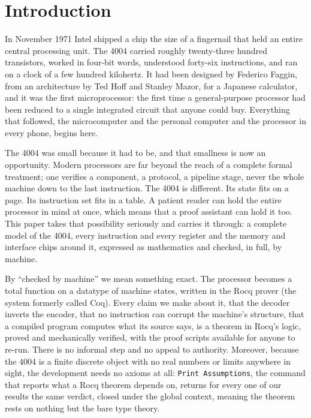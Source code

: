 \documentclass[11pt]{amsart}
\theoremstyle{plain}
\theoremstyle{definition}
\newcommand{\code}[1]{\texttt{#1}}
\begin{document}
\section{Introduction}

In November 1971 Intel shipped a chip the size of a fingernail that held an entire central processing unit. The 4004 carried roughly twenty-three hundred transistors, worked in four-bit words, understood forty-six instructions, and ran on a clock of a few hundred kilohertz. It had been designed by Federico Faggin, from an architecture by Ted Hoff and Stanley Mazor, for a Japanese calculator, and it was the first microprocessor: the first time a general-purpose processor had been reduced to a single integrated circuit that anyone could buy. Everything that followed, the microcomputer and the personal computer and the processor in every phone, begins here.

The 4004 was small because it had to be, and that smallness is now an opportunity. Modern processors are far beyond the reach of a complete formal treatment; one verifies a component, a protocol, a pipeline stage, never the whole machine down to the last instruction. The 4004 is different. Its state fits on a page. Its instruction set fits in a table. A patient reader can hold the entire processor in mind at once, which means that a proof assistant can hold it too. This paper takes that possibility seriously and carries it through: a complete model of the 4004, every instruction and every register and the memory and interface chips around it, expressed as mathematics and checked, in full, by machine.

By ``checked by machine'' we mean something exact. The processor becomes a total function on a datatype of machine states, written in the Rocq prover (the system formerly called Coq). Every claim we make about it, that the decoder inverts the encoder, that no instruction can corrupt the machine's structure, that a compiled program computes what its source says, is a theorem in Rocq's logic, proved and mechanically verified, with the proof scripts available for anyone to re-run. There is no informal step and no appeal to authority. Moreover, because the 4004 is a finite discrete object with no real numbers or limits anywhere in sight, the development needs no axioms at all: \code{Print Assumptions}, the command that reports what a Rocq theorem depends on, returns for every one of our results the same verdict, closed under the global context, meaning the theorem rests on nothing but the bare type theory.
\end{document}
